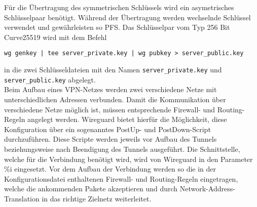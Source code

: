 \noindent F\"ur die \"Ubertragung des symmetrischen Schl\"ussels wird ein asymetrisches Schl\"usselpaar ben\"otigt. W\"ahrend der \"Ubertragung werden wechselnde Schl\"ussel verwendet und gew\"ahrleisten so \ac{PFS}. Das Schl\"usselpar vom Typ 256 Bit Curve25519 wird mit dem Befehl 
\begin{verbatim}
wg genkey | tee server_private.key | wg pubkey > server_public.key
\end{verbatim}
in die zwei Schl\"usseldateien mit den Namen \verb+server_private.key+ und \verb+server_public.key+ abgelegt.\\
Beim Aufbau eines VPN-Netzes werden zwei verschiedene Netze mit unterschiedlichen Adressen verbunden. Damit die Kommunikation über verschiedene Netze möglich ist, müssen entsprechende Firewall- und Routing-Regeln angelegt werden. Wireguard bietet hierfür die Möglichkeit, diese Konfiguration über ein sogenanntes PostUp- und PostDown-Script durchzuführen. Diese Scripte werden jeweils vor Aufbau des Tunnels beziehungsweise nach Beendigung des Tunnels ausgeführt. Die Schnittstelle, welche für die Verbindung benötigt wird, wird von Wireguard in den Parameter \%i eingesetzt. Vor dem Aufbau der Verbindung werden so die in der Konfigurationsdatei enthaltenen Firewall- und Routing-Regeln eingetragen, welche die ankommenden Pakete akzeptieren und durch Network-Address-Translation in das richtige Zielnetz weiterleitet.  

